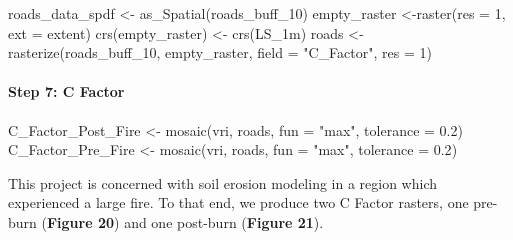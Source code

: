 \documentclass[
]{article}
\newenvironment{Shaded}{\begin{snugshade}}{\end{snugshade}}
\newcommand{\AttributeTok}[1]{\textcolor[rgb]{0.77,0.63,0.00}{#1}}
\newcommand{\DecValTok}[1]{\textcolor[rgb]{0.00,0.00,0.81}{#1}}
\newcommand{\FloatTok}[1]{\textcolor[rgb]{0.00,0.00,0.81}{#1}}
\newcommand{\FunctionTok}[1]{\textcolor[rgb]{0.00,0.00,0.00}{#1}}
\newcommand{\NormalTok}[1]{#1}
\newcommand{\OtherTok}[1]{\textcolor[rgb]{0.56,0.35,0.01}{#1}}
\newcommand{\StringTok}[1]{\textcolor[rgb]{0.31,0.60,0.02}{#1}}
\begin{document}
\begin{Shaded}
\begin{Highlighting}[]
\NormalTok{roads\_data\_spdf }\OtherTok{\textless{}{-}} \FunctionTok{as\_Spatial}\NormalTok{(roads\_buff\_10)}
\NormalTok{empty\_raster }\OtherTok{\textless{}{-}}\FunctionTok{raster}\NormalTok{(}\AttributeTok{res =} \DecValTok{1}\NormalTok{, }\AttributeTok{ext =}\NormalTok{ extent)}
\FunctionTok{crs}\NormalTok{(empty\_raster) }\OtherTok{\textless{}{-}} \FunctionTok{crs}\NormalTok{(LS\_1m)}
\NormalTok{roads }\OtherTok{\textless{}{-}} \FunctionTok{rasterize}\NormalTok{(roads\_buff\_10, empty\_raster, }\AttributeTok{field =} \StringTok{"C\_Factor"}\NormalTok{, }\AttributeTok{res =} \DecValTok{1}\NormalTok{)}
\end{Highlighting}
\end{Shaded}

\hypertarget{sec-step-6-c-factor-c}{%
\paragraph*{Step 7: C Factor}\label{sec-step-6-c-factor-c}}

\begin{Shaded}
\begin{Highlighting}[]
\NormalTok{C\_Factor\_Post\_Fire }\OtherTok{\textless{}{-}} \FunctionTok{mosaic}\NormalTok{(vri, roads, }\AttributeTok{fun =} \StringTok{"max"}\NormalTok{, }\AttributeTok{tolerance =} \FloatTok{0.2}\NormalTok{)}
\NormalTok{C\_Factor\_Pre\_Fire }\OtherTok{\textless{}{-}} \FunctionTok{mosaic}\NormalTok{(vri, roads, }\AttributeTok{fun =} \StringTok{"max"}\NormalTok{, }\AttributeTok{tolerance =} \FloatTok{0.2}\NormalTok{)}
\end{Highlighting}
\end{Shaded}

This project is concerned with soil erosion modeling in a region which experienced a large fire. To that end, we produce two C Factor rasters, one pre-burn (\textbf{Figure 20}) and one post-burn (\textbf{Figure 21}).
\end{document}
